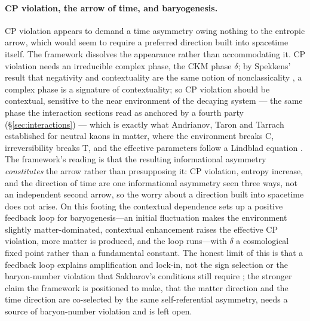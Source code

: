 \paragraph{CP violation, the arrow of time, and baryogenesis.}
CP violation appears to demand a time asymmetry owing nothing to the entropic
arrow, which would seem to require a preferred direction built into spacetime
itself. The framework dissolves the appearance rather than accommodating it. CP
violation needs an irreducible complex phase, the CKM phase $\delta$; by Spekkens'
result that negativity and contextuality are the same notion of nonclassicality
\autocite{spekkens2007toy}, a complex phase is a signature of contextuality; so CP
violation should be contextual, sensitive to the near environment of the decaying system --- the
same phase the interaction sections read as anchored by a fourth party
(\S\ref{sec:interactions}) --- which is exactly what Andrianov, Taron and Tarrach established for
neutral kaons in matter, where the environment breaks C, irreversibility breaks
T, and the effective parameters follow a Lindblad equation
\autocite{Andrianov2001}. The framework's reading is that the resulting
informational asymmetry \emph{constitutes} the arrow rather than presupposing it:
CP violation, entropy increase, and the direction of time are one informational
asymmetry seen three ways, not an independent second arrow, so the worry about a
direction built into spacetime does not arise. On this footing the contextual
dependence sets up a positive feedback loop for baryogenesis---an initial
fluctuation makes the environment slightly matter-dominated, contextual
enhancement raises the effective CP violation, more matter is produced, and the
loop runs---with $\delta$ a cosmological fixed point rather than a fundamental
constant. The honest limit of this is that a feedback loop explains amplification
and lock-in, not the sign selection or the baryon-number violation that
Sakharov's conditions still require \autocite{Sakharov1967}; the stronger claim
the framework is positioned to make, that the matter direction and the time
direction are co-selected by the same self-referential asymmetry, needs a source
of baryon-number violation and is left open.

